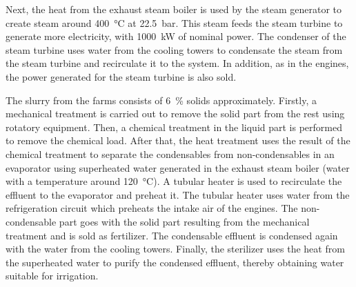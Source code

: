 Next, the heat from the exhaust steam boiler is used by the steam generator to create steam around \SI{400}{\celsius} at \SI{22.5}{bar}. This steam feeds the steam turbine to generate more electricity, with \SI{1000}{kW} of nominal power. The condenser of the steam turbine uses water from the cooling towers to condensate the steam from the steam turbine and recirculate it to the system. In addition, as in the engines, the power generated for the steam turbine is also sold. 

The slurry from the farms consists of \SI{6}{\percent} solids approximately. Firstly, a mechanical treatment is carried out to remove the solid part from the rest using rotatory equipment. Then, a chemical treatment in the liquid part is performed to remove the chemical load. After that, the heat treatment uses the result of the chemical treatment to separate the condensables from non-condensables in an evaporator using superheated water generated in the exhaust steam boiler (water with a temperature around \SI{120}{\celsius}). A tubular heater is used to recirculate the effluent to the evaporator and preheat it. The tubular heater uses water from the refrigeration circuit which preheats the intake air of the engines. The non-condensable part goes with the solid part resulting from the mechanical treatment and is sold as fertilizer. The condensable effluent is condensed again with the water from the cooling towers. Finally, the sterilizer uses the heat from the superheated water to purify the condensed effluent, thereby obtaining water suitable for irrigation. 